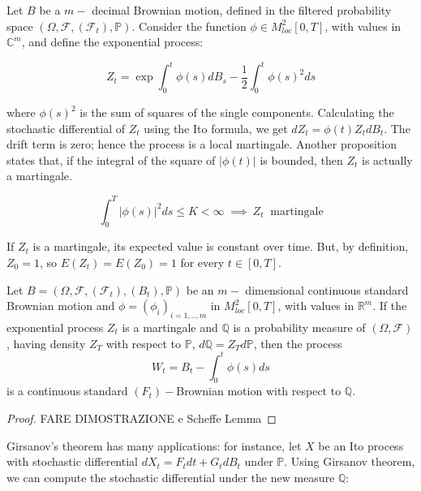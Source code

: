 Let $B$ be a $m-$ decimal Brownian motion, defined in the filtered probability space $(\Omega,\mathcal{F},(\mathcal{F}_t),\mathbb{P})$. Consider the function $\phi \in M^2_{loc}[0,T]$, with values in $\mathbb{C}^m$, and define the exponential process:

\begin{equation}
    Z_t = \exp{\int_0^t \phi(s) dB_s - \frac{1}{2} \int_0^t \phi(s)^2 ds}
\end{equation}

where $\phi(s)^2$ is the sum of squares of the single components. Calculating the stochastic differential of $Z_t$ using the Ito formula, we get $dZ_t = \phi(t) Z_t dB_t$. The drift term is zero; hence the process is a local martingale. Another proposition states that, if the integral of the square of $\vert \phi(t) \vert$ is bounded, then $Z_t$ is actually a martingale. 

\begin{equation*}
    \int_0^T \vert \phi(s) \vert^2 ds \leq K < \infty \; \implies \: Z_t \;\;\text{martingale}
\end{equation*}

If $Z_t$ is a martingale, its expected value is constant over time. But, by definition, $Z_0 = 1$, so $E(Z_t) = E(Z_0) = 1$ for every $t \in [0,T]$. 

\begin{theorem}[Girsanov]
    Let $B = (\Omega, \mathcal{F}, (\mathcal{F}_t), (B_t), \mathbb{P})$ be an $m-$ dimensional continuous standard Brownian motion and $\phi = (\phi_i)_{i=1,..,m}$ in $M^2_{loc}[0,T]$, with values in $\mathbb{R}^m$. If the exponential process $Z_t$ is a martingale and $\mathbb{Q}$ is a probability measure of $(\Omega,\mathcal{F})$, having density $Z_T$ with respect to $\mathbb{P}$, $d\mathbb{Q} = Z_T d\mathbb{P}$, then the process 
    \begin{equation}
        W_t = B_t - \int_0^t \phi(s) ds
    \end{equation}
    is a continuous standard $(F_t)-$Brownian motion with respect to $\mathbb{Q}$. 
\end{theorem}
\begin{proof}
    FARE DIMOSTRAZIONE e Scheffe Lemma
\end{proof}

Girsanov's theorem has many applications: for instance, let $X$ be an Ito process with stochastic differential $dX_t = F_t dt + G_t dB_t$ under $\mathbb{P}$. Using Girsanov theorem, we can compute the stochastic differential under the new  measure $\mathbb{Q}$: 


